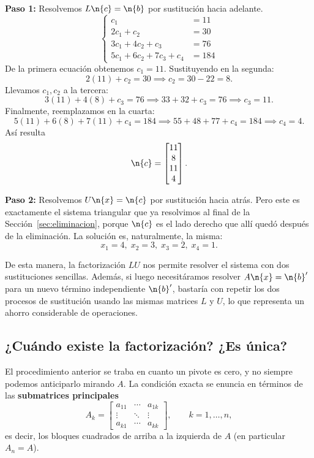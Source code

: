 \textbf{Paso 1:} Resolvemos $L\n{c} = \n{b}$ por sustitución hacia adelante.
\[
\left\{
\begin{aligned}
c_1 &= 11 \\
2c_1 + c_2 &= 30 \\
3c_1 + 4c_2 + c_3 &= 76 \\
5c_1 + 6c_2 + 7c_3 + c_4 &= 184
\end{aligned}
\right.
\]
De la primera ecuación obtenemos $c_1 = 11$. Sustituyendo en la segunda:
\[
2(11) + c_2 = 30 \implies c_2 = 30 - 22 = 8.
\]
Llevamos $c_1, c_2$ a la tercera:
\[
3(11) + 4(8) + c_3 = 76 \implies 33 + 32 + c_3 = 76 \implies c_3 = 11.
\]
Finalmente, reemplazamos en la cuarta:
\[
5(11) + 6(8) + 7(11) + c_4 = 184 \implies 55 + 48 + 77 + c_4 = 184 \implies c_4 = 4.
\]
Así resulta
\[
\n{c} = \begin{bmatrix} 11 \\ 8 \\ 11 \\ 4 \end{bmatrix}.
\]

\textbf{Paso 2:} Resolvemos $U\n{x} = \n{c}$ por sustitución hacia atrás. Pero
este es exactamente el sistema triangular que ya resolvimos al final de la
Sección~\ref{sec:eliminacion}, porque $\n{c}$ es el lado derecho que allí
quedó después de la eliminación. La solución es, naturalmente, la misma:
\[
\boxed{x_1 = 4,\; x_2 = 3,\; x_3 = 2,\; x_4 = 1}.
\]

De esta manera, la factorización $LU$ nos permite resolver el sistema con dos sustituciones sencillas. Además, si luego necesitáramos resolver $A\n{x} = \n{b}'$ para un nuevo término independiente $\n{b}'$, bastaría con repetir los dos procesos de sustitución usando las mismas matrices $L$ y $U$, lo que representa un ahorro considerable de operaciones.


\subsection{¿Cuándo existe la factorización? ¿Es única?}

El procedimiento anterior se traba en cuanto un pivote es cero, y no siempre
podemos anticiparlo mirando $A$. La condición exacta se enuncia en términos de
las \textbf{submatrices principales}
\[
A_k = \begin{bmatrix}
a_{11} & \cdots & a_{1k}\\
\vdots & \ddots & \vdots\\
a_{k1} & \cdots & a_{kk}
\end{bmatrix},
\qquad k=1,\dots,n,
\]
es decir, los bloques cuadrados de arriba a la izquierda de $A$ (en particular
$A_n = A$).

